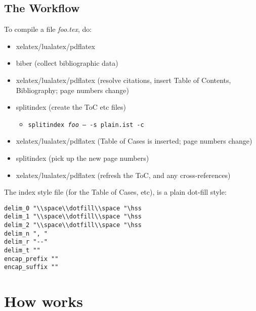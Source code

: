 \subsection{The Workflow}
To compile a file \textit{foo.tex}, do:
\begin{itemize}
\item xelatex/lualatex/pdflatex
\item biber (collect bibliographic data)
\item xelatex/lualatex/pdflatex (resolve citations, insert Table of Contents, Bibliography; page numbers change)
\item splitindex (create the ToC etc files)
\begin{itemize}
\item[] \texttt{splitindex \textit{foo} -- -s plain.ist -c}
\end{itemize}
\item xelatex/lualatex/pdflatex (Table of Cases is inserted; page numbers change)
\item splitindex (pick up the new page numbers)
\item xelatex/lualatex/pdflatex (refresh the ToC, and any cross-references)
\end{itemize}
The index style file (for the Table of Cases, etc), is a plain dot-fill style:
\begin{verbatim}
delim_0 "\\space\\dotfill\\space "\hss
delim_1 "\\space\\dotfill\\space "\hss
delim_2 "\\space\\dotfill\\space "\hss
delim_n ", "
delim_r "--"
delim_t ""
encap_prefix ""
encap_suffix ""
\end{verbatim}

\section{How  works}

